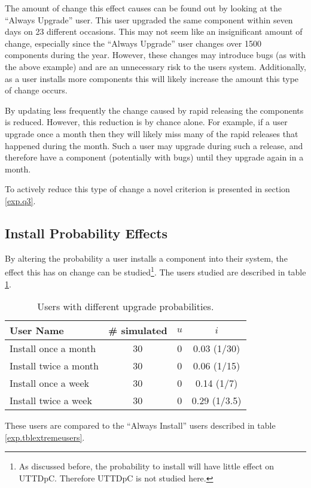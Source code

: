 The amount of change this effect causes can be found out by looking at the ``Always Upgrade'' user.
This user upgraded the same component within seven days on 23 different occasions.
This may not seem like an insignificant amount of change, especially since the ``Always Upgrade'' user changes over 1500 components during the year.
However, these changes may introduce bugs (as with the above example) and are an unnecessary risk to the users system.
Additionally, as a user installs more components this will likely increase the amount this type of change occurs.

By updating less frequently the change caused by rapid releasing the components is reduced.
However, this reduction is by chance alone.
For example, if a user upgrade once a month then they will likely miss many of the rapid releases that happened during the month.
Such a user may upgrade during such a release, and therefore have a component (potentially with bugs) until they upgrade again in a month.

To actively reduce this type of change a novel criterion is presented in section \ref{exp.q3}.

\subsection{Install Probability Effects}
By altering the probability a user installs a component into their system, the effect this has on 
change can be studied\footnote{As discussed before, the probability to install will have little effect on UTTDpC. Therefore UTTDpC is not studied here.}.
The users studied are described in table \ref{exp.tblq1cusers}.
\begin{table}[h!]
\centering
\begin{tabular}{|l | c | c | c |}
\hline
User Name 				& \# simulated 	& $u$ 		& $i$ 			\\ \hline
Install once a month	& 30 			& 0 & 0.03 (1/30)							 \\
Install twice a month	& 30 			& 0 & 0.06 (1/15)						\\
Install once a week		& 30 			& 0 & 0.14 (1/7)					 \\
Install twice a week 	& 30 			& 0 & 0.29 (1/3.5)						\\ \hline
\end{tabular}
\caption{Users with different upgrade probabilities.}
\label{exp.tblq1cusers}
\end{table}
These users are compared to the ``Always Install'' users described in table \ref{exp.tblextremeusers}.

